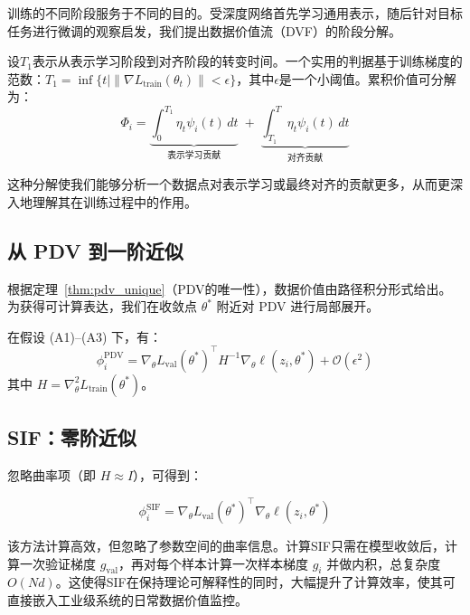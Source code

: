 训练的不同阶段服务于不同的目的。受深度网络首先学习通用表示，随后针对目标任务进行微调的观察启发\cite{zeiler2014visualizing}，我们提出数据价值流（DVF）的阶段分解。

设\(T_1\)表示从表示学习阶段到对齐阶段的转变时间。一个实用的判据基于训练梯度的范数：\(T_1 = \inf\{ t \mid \|\nabla L_{\text{train}}(\theta_t)\| < \epsilon \}\)，其中\(\epsilon\)是一个小阈值。累积价值可分解为：
\begin{equation}
\Phi_i = \underbrace{\int_{0}^{T_1} \eta_t \psi_i(t) \, dt}_{\text{表示学习贡献}} \;+\; \underbrace{\int_{T_1}^{T} \eta_t \psi_i(t) \, dt}_{\text{对齐贡献}}
\end{equation}

这种分解使我们能够分析一个数据点对表示学习或最终对齐的贡献更多，从而更深入地理解其在训练过程中的作用。

\subsection{从 PDV 到一阶近似}

根据定理~\ref{thm:pdv_unique}（PDV的唯一性），数据价值由路径积分形式给出。为获得可计算表达，我们在收敛点 \(\theta^*\) 附近对 PDV 进行局部展开。

\begin{lemma}
\label{lem:pdv_expansion}
在假设 (A1)--(A3) 下，有：
\begin{equation}
\phi_i^{\mathrm{PDV}} = \nabla_\theta L_{\mathrm{val}}(\theta^*)^\top H^{-1} \nabla_\theta \ell(z_i, \theta^*) + \mathcal{O}(\epsilon^2)
\label{eq:pdv_expansion}
\end{equation}
其中 \(H = \nabla_\theta^2 L_{\mathrm{train}}(\theta^*)\)。
\end{lemma}

\subsection{SIF：零阶近似}

忽略曲率项（即 \(H \approx I\)），可得到：

\begin{equation}
\phi_i^{\mathrm{SIF}} = \nabla_\theta L_{\mathrm{val}}(\theta^*)^\top \nabla_\theta \ell(z_i, \theta^*)
\label{eq:sif}
\end{equation}

该方法计算高效，但忽略了参数空间的曲率信息。计算SIF只需在模型收敛后，计算一次验证梯度 \(g_{\mathrm{val}}\)，再对每个样本计算一次样本梯度 \(g_i\) 并做内积，总复杂度 \(O(Nd)\)。这使得SIF在保持理论可解释性的同时，大幅提升了计算效率，使其可直接嵌入工业级系统的日常数据价值监控。

